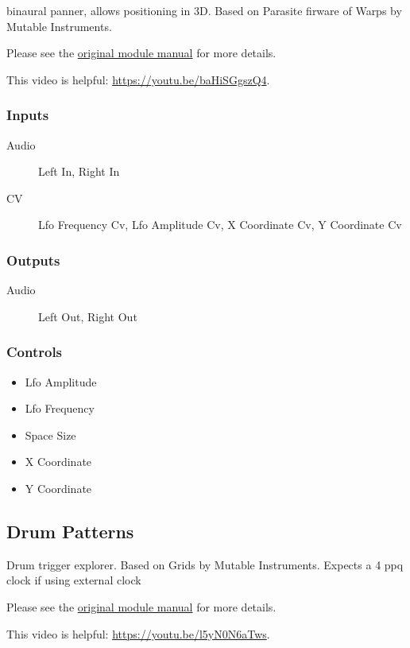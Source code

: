 binaural panner, allows positioning in 3D. Based on Parasite firware of Warps by Mutable Instruments.



Please see the \href{https://mqtthiqs.github.io/parasites/warps.html}{original module manual} for more details.

This video is helpful: \url{https://youtu.be/baHiSGgszQ4}.

\subsubsection{Inputs}
\begin{description}
\item [Audio] Left In, Right In
\item [CV] Lfo Frequency Cv, Lfo Amplitude Cv, X Coordinate Cv, Y Coordinate Cv
\end{description}

\subsubsection{Outputs}
\begin{description}
\item [Audio] Left Out, Right Out
\end{description}

\subsubsection{Controls}
\begin{itemize}
\item Lfo Amplitude
\item Lfo Frequency
\item Space Size
\item X Coordinate
\item Y Coordinate
\end{itemize}

\subsection{Drum Patterns}

Drum trigger explorer. Based on Grids by Mutable Instruments. Expects a 4 ppq clock if using external clock



Please see the \href{https://mutable-instruments.net/modules/grids/manual/}{original module manual} for more details.

This video is helpful: \url{https://youtu.be/l5yN0N6aTws}.

